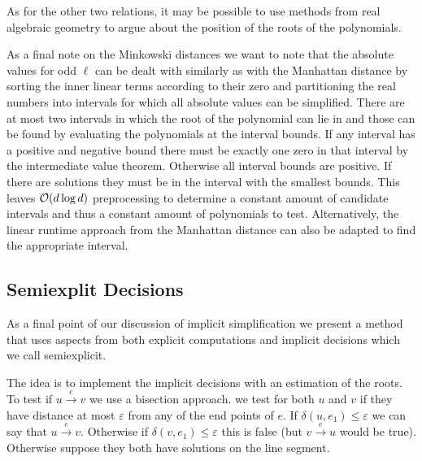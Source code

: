 As for the other two relations, it may be possible to use methods from real algebraic geometry to argue about the position of the roots of the polynomials. 

As a final note on the Minkowski distances we want to note that the absolute values for odd \(\ell\) can be dealt with similarly as with the Manhattan distance by sorting the inner linear terms according to their zero and partitioning the real numbers into intervals for which all absolute values can be simplified. There are at most two intervals in which the root of the polynomial can lie in and those can be found by evaluating the polynomials at the interval bounds. If any interval has a positive and negative bound there must be exactly one zero in that interval by the intermediate value theorem. Otherwise all interval bounds are positive. If there are solutions they must be in the interval with the smallest bounds. This leaves \(\mathcal{O}(d\log d)\) preprocessing to determine a constant amount of candidate intervals and thus a constant amount of polynomials to test. Alternatively, the linear runtime approach from the Manhattan distance can also be adapted to find the appropriate interval. 

\subsection{Semiexplit Decisions}
As a final point of our discussion of implicit simplification we present a method that uses aspects from both explicit computations and implicit decisions which we call semiexplicit. 

The idea is to implement the implicit decisions with an estimation of the roots. To test if \(u \overset e\rightarrow v\) we use a bisection approach. we test for both \(u\) and \(v\) if they have distance at most \(\varepsilon\) from any of the end points of \(e\). If \(\delta(u, e_1) \leq \varepsilon\) we can say that \(u \overset e\rightarrow v\). Otherwise if \(\delta(v, e_1) \leq \varepsilon\) this is false (but \(v \overset e\rightarrow u\) would be true). Otherwise suppose they both have solutions on the line segment. 

